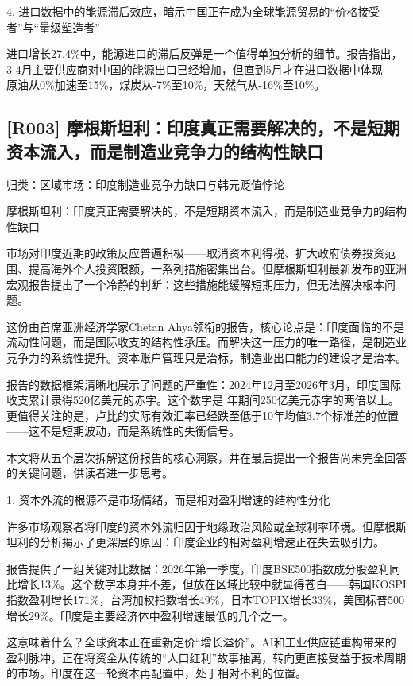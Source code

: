 \documentclass[11pt]{ctexart}
\begin{document}
4. 进口数据中的能源滞后效应，暗示中国正在成为全球能源贸易的“价格接受者”与“量级塑造者”

进口增长27.4\%中，能源进口的滞后反弹是一个值得单独分析的细节。报告指出，3-4月主要供应商对中国的能源出口已经增加，但直到5月才在进口数据中体现——原油从0\%加速至15\%，煤炭从-7\%至10\%，天然气从-16\%至10\%。

\subsection{[R003] 摩根斯坦利：印度真正需要解决的，不是短期资本流入，而是制造业竞争力的结构性缺口}
{\small\color{refgray}归类：区域市场：印度制造业竞争力缺口与韩元贬值悖论}

摩根斯坦利：印度真正需要解决的，不是短期资本流入，而是制造业竞争力的结构性缺口

市场对印度近期的政策反应普遍积极——取消资本利得税、扩大政府债券投资范围、提高海外个人投资限额，一系列措施密集出台。但摩根斯坦利最新发布的亚洲宏观报告提出了一个冷静的判断：这些措施能缓解短期压力，但无法解决根本问题。

这份由首席亚洲经济学家Chetan Ahya领衔的报告，核心论点是：印度面临的不是流动性问题，而是国际收支的结构性承压。而解决这一压力的唯一路径，是制造业竞争力的系统性提升。资本账户管理只是治标，制造业出口能力的建设才是治本。

报告的数据框架清晰地展示了问题的严重性：2024年12月至2026年3月，印度国际收支累计录得520亿美元的赤字。这个数字是 年期间250亿美元赤字的两倍以上。更值得关注的是，卢比的实际有效汇率已经跌至低于10年均值3.7个标准差的位置——这不是短期波动，而是系统性的失衡信号。

本文将从五个层次拆解这份报告的核心洞察，并在最后提出一个报告尚未完全回答的关键问题，供读者进一步思考。

1. 资本外流的根源不是市场情绪，而是相对盈利增速的结构性分化

许多市场观察者将印度的资本外流归因于地缘政治风险或全球利率环境。但摩根斯坦利的分析揭示了更深层的原因：印度企业的相对盈利增速正在失去吸引力。

报告提供了一组关键对比数据：2026年第一季度，印度BSE500指数成分股盈利同比增长13\%。这个数字本身并不差，但放在区域比较中就显得苍白——韩国KOSPI指数盈利增长171\%，台湾加权指数增长49\%，日本TOPIX增长33\%，美国标普500增长29\%。印度是主要经济体中盈利增速最低的几个之一。

这意味着什么？全球资本正在重新定价“增长溢价”。AI和工业供应链重构带来的盈利脉冲，正在将资金从传统的“人口红利”故事抽离，转向更直接受益于技术周期的市场。印度在这一轮资本再配置中，处于相对不利的位置。
\end{document}

